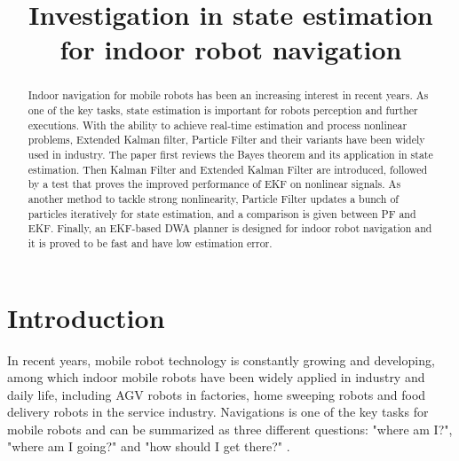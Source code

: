 \documentclass[conference]{IEEEtran}
\begin{document}
	
	\title{Investigation in state estimation for indoor robot navigation\\
	}
	
	\author{
	}
	
	\maketitle
	
	\begin{abstract}
		Indoor navigation for mobile robots has been an increasing interest in recent years. As one of the key tasks, state estimation is important for robots perception and further executions. With the ability to achieve real-time estimation and process nonlinear problems, Extended Kalman filter, Particle Filter and their variants have been widely used in industry. The paper first reviews the Bayes theorem and its application in state estimation. Then Kalman Filter and Extended Kalman Filter are introduced, followed by a test that proves the improved performance of EKF on nonlinear signals. As another method to tackle strong nonlinearity, Particle Filter updates a bunch of particles iteratively for state estimation, and a comparison is given between PF and EKF. Finally, an EKF-based DWA planner is designed for indoor robot navigation and it is proved to be fast and have low estimation error.
	\end{abstract}
	
	
	\section{Introduction}
	
	In recent years, mobile robot technology is constantly growing and developing, among which indoor mobile robots have been widely applied in industry and daily life, including AGV robots in factories, home sweeping robots and food delivery robots in the service industry. Navigations is one of the key tasks for mobile robots and can be summarized as three different questions: "where am I?", "where am I going?" and "how should I get there?" \cite{leonard1991mobile}. 
	
\end{document}
